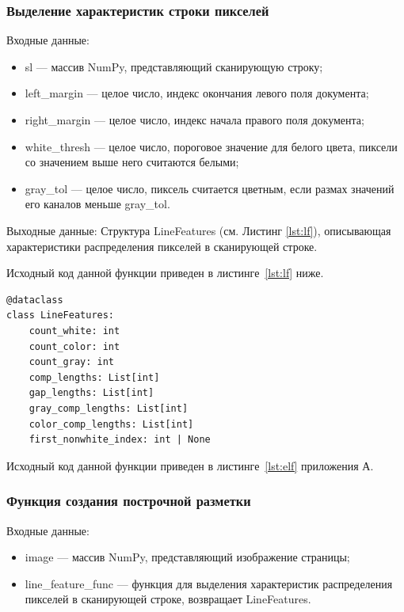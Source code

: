 \subsubsection{Выделение характеристик строки пикселей}
Входные данные:
\begin{itemize}
    \item sl --- массив NumPy, представляющий сканирующую строку;
    \item left\_margin --- целое число, индекс окончания левого поля документа;
    \item right\_margin --- целое число, индекс начала правого поля документа;
    \item white\_thresh --- целое число, пороговое значение для белого цвета, пиксели со значением выше него считаются белыми;
    \item gray\_tol --- целое число, пиксель считается цветным, если размах значений его каналов меньше gray\_tol.
\end{itemize}

Выходные данные: Структура LineFeatures (см. Листинг \ref{lst:lf}), описывающая характеристики распределения пикселей в сканирующей строке.

Исходный код данной функции приведен в листинге~\ref{lst:lf} ниже.

\begin{lstlisting}[caption={Структура LineFeatures}, label={lst:lf}]
@dataclass
class LineFeatures:
    count_white: int
    count_color: int
    count_gray: int
    comp_lengths: List[int]
    gap_lengths: List[int]
    gray_comp_lengths: List[int]
    color_comp_lengths: List[int]
    first_nonwhite_index: int | None
\end{lstlisting}

Исходный код данной функции приведен в листинге~\ref{lst:elf} приложения А.

\subsubsection{Функция создания построчной разметки} %
Входные данные:
\begin{itemize}
    \item image --- массив NumPy, представляющий изображение страницы;
    \item line\_feature\_func --- функция для выделения характеристик распределения пикселей в сканирующей строке, возвращает LineFeatures.
\end{itemize}

